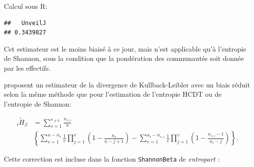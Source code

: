 \documentclass[
  11pt,
  french,
  a4paper,
  extrafontsizes,onecolumn,openright
  ]{memoir}
\newenvironment{Shaded}{\begin{snugshade}}{\end{snugshade}}
\newcommand{\AttributeTok}[1]{\textcolor[rgb]{0.13,0.29,0.53}{#1}}
\newcommand{\CommentTok}[1]{\textcolor[rgb]{0.56,0.35,0.01}{\textit{#1}}}
\newcommand{\DecValTok}[1]{\textcolor[rgb]{0.00,0.00,0.81}{#1}}
\newcommand{\FunctionTok}[1]{\textcolor[rgb]{0.13,0.29,0.53}{\textbf{#1}}}
\newcommand{\NormalTok}[1]{#1}
\newcommand{\OtherTok}[1]{\textcolor[rgb]{0.56,0.35,0.01}{#1}}
\newcommand{\SpecialCharTok}[1]{\textcolor[rgb]{0.81,0.36,0.00}{\textbf{#1}}}
\newcommand{\StringTok}[1]{\textcolor[rgb]{0.31,0.60,0.02}{#1}}
\begin{document}
Calcul sous R:

\scriptsize

\begin{Shaded}
\end{Shaded}

\begin{verbatim}
##   UnveilJ 
## 0.3439827
\end{verbatim}

\normalsize

Cet estimateur est le moins biaisé à ce jour, mais n'est applicable qu'à l'entropie de Shannon, sous la condition que la pondération des communautés soit donnée par les effectifs.

\textcite{Zhang2014a} proposent un estimateur de la divergence de Kullback-Leibler avec un biais réduit selon la même méthode que pour l'estimation de l'entropie HCDT ou de l'entropie de Shannon:

\begin{align}
  \label{eq:Zhang2014a}
  _{i}\tilde{H}_{\beta} 
  &= \sum^{s_{\ne 0}}_{s=1}{\frac{n_{s,i}}{n} }\\
    &\left\{ \sum^{n-n_s}_{v=1}{\frac{1}{v} \prod^v_{j=1}{ \left( 1-\frac{n_s}{n-j+1} \right) }}
     -  \sum^{n_i-n_{s,i}}_{v=1}{\frac{1}{v} \prod^v_{j=1}{\left( 1-\frac{n_{s,i}-1}{n_i-j} \right) }} \right\}.
\end{align}

Cette correction est incluse dans la fonction \texttt{ShannonBeta} de \emph{entropart} :

\scriptsize

\begin{Shaded}
\end{Shaded}
\end{document}
